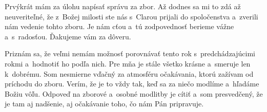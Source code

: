 







Prvýkrát mám za úlohu napísať správu za zbor. Až dodnes sa mi to zdá až neuveriteľné, že z~Božej milosti ste nás s~Clarou  prijali do spoločenstva a~zverili nám vedenie tohto zboru. Je nám cťou a~tú zodpovednosť berieme vážne a~s~radosťou.  Ďakujeme vám za dôveru.

Priznám sa, že veľmi nemám možnosť  porovnávať tento rok s~predchádzajúcimi rokmi a~hodnotiť ho podľa nich. Pre mňa je stále všetko krásne a~smeruje len k~dobrému.  Som nesmierne vďačný za atmosféru očakávania, ktorú zažívam od príchodu do zboru. Verím, že je to vždy tak, keď sa za niečo modlíme a~hľadáme Božiu vôľu. Odpoveď na zborové a~osobné modlitby je cítiť a~som presvedčený, že je tam aj nadšenie, aj očakávanie toho, čo nám Pán pripravuje.

